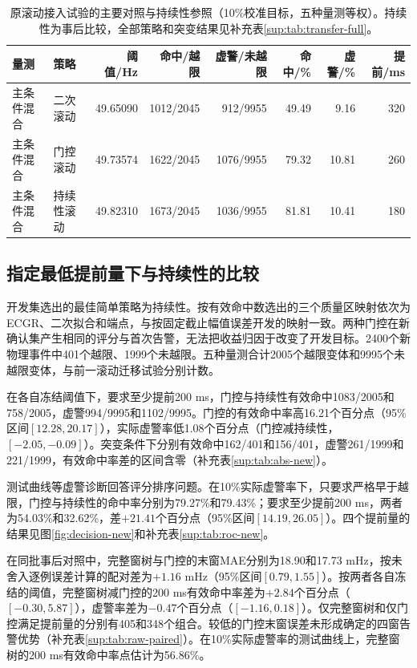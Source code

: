\documentclass[UTF8,a4paper,11pt]{ctexart}
\begin{document}
\begin{table}[!htbp]\centering\small\setlength{\tabcolsep}{4pt}
\caption{原滚动接入试验的主要对照与持续性参照（10\%校准目标，五种量测等权）。持续性为事后比较，全部策略和突变结果见补充表\ref{sup:tab:transfer-full}。}\label{tab:transfer-abs}
\begin{tabular}{llrrrrrr}
\toprule
量测 & 策略 & 阈值/Hz & 命中/越限 & 虚警/未越限 & 命中/\% & 虚警/\% & 提前/ms \\
\midrule
主条件混合 & 二次滚动 & 49.65090 & 1012/2045 & 912/9955 & 49.49 & 9.16 & 320 \\
主条件混合 & 门控滚动 & 49.73574 & 1622/2045 & 1076/9955 & 79.32 & 10.81 & 260 \\
主条件混合 & 持续性滚动 & 49.82310 & 1673/2045 & 1036/9955 & 81.81 & 10.41 & 180 \\
\bottomrule\end{tabular}\end{table}

\subsection{指定最低提前量下与持续性的比较}\label{sec:new-agg}
开发集选出的最佳简单策略为持续性。按有效命中数选出的三个质量区映射依次为ECGR、二次拟合和端点，与按固定截止幅值误差开发的映射一致。两种门控在新确认集产生相同的评分与首次告警，无法把收益归因于改变了开发目标。2400个新物理事件中401个越限、1999个未越限。五种量测合计2005个越限变体和9995个未越限变体，与前一滚动迁移试验分别计数。

在各自冻结阈值下，要求至少提前200 ms，门控与持续性有效命中1083/2005和758/2005，虚警994/9995和1102/9995。门控的有效命中率高16.21个百分点（95\%区间$[12.28,20.17]$），实际虚警率低1.08个百分点（门控减持续性，$[-2.05,-0.09]$）。突变条件下分别有效命中162/401和156/401，虚警261/1999和221/1999，有效命中率差的区间含零（补充表\ref{sup:tab:abs-new}）。

测试曲线等虚警诊断回答评分排序问题。在10\%实际虚警率下，只要求严格早于越限，门控与持续性的命中率分别为79.27\%和79.43\%；要求至少提前200 ms，两者为54.03\%和32.62\%，差$+21.41$个百分点（95\%区间$[14.19,26.05]$）。四个提前量的结果见图\ref{fig:decision-new}和补充表\ref{sup:tab:roc-new}。

在同批事后对照中，完整窗树与门控的末窗MAE分别为18.90和17.73 mHz，按未舍入逐例误差计算的配对差为$+1.16$ mHz（95\%区间$[0.79,1.55]$）。按两者各自冻结的阈值，完整窗树减门控的200 ms有效命中率差为$+2.84$个百分点（$[-0.30,5.87]$），虚警率差为$-0.47$个百分点（$[-1.16,0.18]$）。仅完整窗树和仅门控满足提前量的分别有405和348个组合。较低的门控末窗误差未形成确定的四窗告警优势（补充表\ref{sup:tab:raw-paired}）。在10\%实际虚警率的测试曲线上，完整窗树的200 ms有效命中率点估计为56.86\%。
\end{document}
